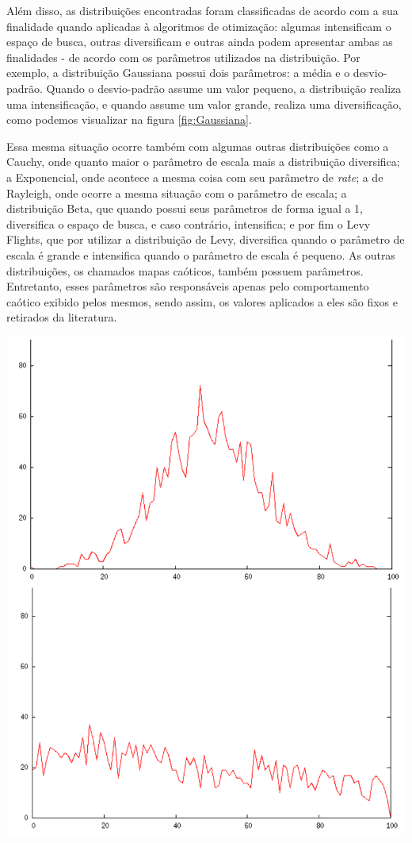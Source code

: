 
Além disso, as distribuições encontradas foram classificadas de acordo com a sua finalidade quando aplicadas à algoritmos de otimização: algumas intensificam o espaço de busca, outras diversificam e outras ainda podem apresentar ambas as finalidades - de acordo com os parâmetros utilizados na distribuição. Por exemplo, a distribuição Gaussiana possui dois parâmetros: a média e o desvio-padrão. Quando o desvio-padrão assume um valor pequeno, a distribuição realiza uma intensificação, e quando assume um valor grande, realiza uma diversificação, como podemos visualizar na figura \ref{fig:Gaussiana}. 

Essa mesma situação ocorre também com algumas outras distribuições como a Cauchy, onde quanto maior o parâmetro de escala mais a distribuição diversifica; a Exponencial, onde acontece a mesma coisa com seu parâmetro de \textit{rate}; a de Rayleigh, onde ocorre a mesma situação com o parâmetro de escala; a distribuição Beta, que quando possui seus parâmetros de forma igual a 1, diversifica o espaço de busca, e caso contrário, intensifica; e por fim o Levy Flights, que por utilizar a distribuição de Levy, diversifica quando o parâmetro de escala é grande e intensifica quando o parâmetro de escala é pequeno. As outras distribuições, os chamados mapas caóticos, também possuem parâmetros. Entretanto, esses parâmetros são responsáveis apenas pelo comportamento caótico exibido pelos mesmos, sendo assim, os valores aplicados a eles são fixos e retirados da literatura.

{
    \centering
    \includegraphics[width=0.7\linewidth]{figuras/gaussian.png}
    \label{fig:Gaussiana}
}


